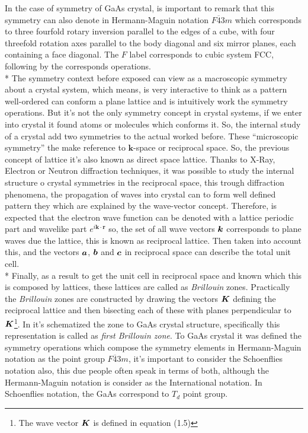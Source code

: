In the case of symmetry of GaAs crystal, is important to remark that this symmetry can also denote in Hermann-Maguin notation  $F\overline{4}3m$ which corresponds to three fourfold rotary inversion parallel to the edges of a cube, with four threefold rotation axes parallel to the body diagonal and six mirror planes, each containing a face diagonal\cite{chatterjee2008crystallography}. The $F$ label corresponds to cubic system FCC, following by the corresponds operations.  \\*
The symmetry context before exposed can view as a macroscopic symmetry about  a crystal system, which means, is very interactive to think as a pattern well-ordered can conform a plane lattice and is intuitively work the symmetry operations. But it's not  the only  symmetry concept in crystal systems, if  we enter into crystal it found atoms or molecules which conforms it. So, the internal study of a crystal add two symmetries to the actual worked before. These ``microscopic symmetry''\cite{chatterjee2008crystallography} the make reference to $\boldsymbol{k}$-space or reciprocal space.  So, the previous concept of lattice it's also known as direct space lattice.
Thanks to X-Ray, Electron or Neutron diffraction techniques, it was possible to study the internal structure o crystal symmetries in the reciprocal space, this trough diffraction phenomena, the propagation of waves into crystal can to form well defined pattern they which are explained by the wave-vector concept\cite{malgrange2014symmetry,powell2010symmetry}. Therefore, is expected  that the electron wave function can be denoted with a lattice periodic part  and wavelike part $e^{i\boldsymbol{k}\cdotp\boldsymbol{r}}$ so, the set of all wave vectors $\boldsymbol k$ corresponds to plane waves due the lattice, this is known as reciprocal lattice\cite{ashcroft1976solid}.  
Then taken into account this, and  the vectors  $\boldsymbol a$, $\boldsymbol b$ and $\boldsymbol c$ in reciprocal space can describe the total unit cell\cite{ashcroft1976solid,powell2010symmetry}. \\*
Finally, as a result to get the unit cell in reciprocal space and known which this is composed by lattices, these lattices are called as \emph{Brillouin} zones. Practically the \emph{Brillouin} zones are constructed by drawing the vectors $\boldsymbol K$ defining the reciprocal lattice and then bisecting each of these with planes perpendicular to  $\boldsymbol K$\cite{powell2010symmetry}\footnote{The wave vector  $\boldsymbol K$ is defined in\cite{powell2010chapter1} equation (1.5)}. In  it's schematized the \brill zone to GaAs crystal structure, specifically this representation is called as \emph{ first Brillouin zone}.
To GaAs crystal it was defined the symmetry operations which compose the symmetry elements in Hermann-Maguin notation as the  point group  $F\overline{4}3m$, it's important to consider the Schoenflies notation also,  this due people often speak in terms of both, although the Hermann-Maguin notation is consider as the International notation. In Schoenflies notation, the GaAs correspond to $T_{d}$ point group. 

